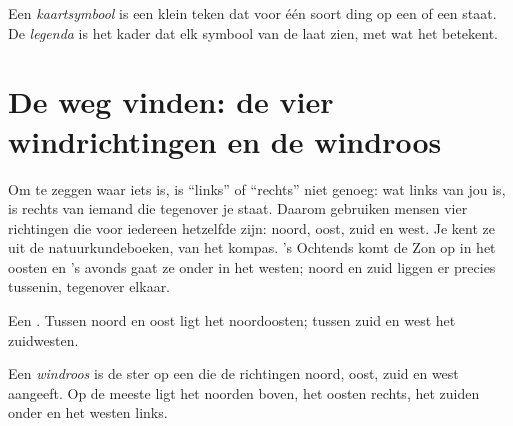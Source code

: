 \begin{definition}[Legenda]\label{def:g2:drawing-to-map:legend}
Een \emph{kaartsymbool} is een klein teken dat voor één
soort ding op een  of een  staat. De
\emph{legenda} is het kader dat elk symbool van de 
laat zien, met wat het betekent.
\end{definition}

\section{De weg vinden: de vier windrichtingen en de windroos}

Om te zeggen waar iets is, is ``links'' of ``rechts'' niet genoeg: wat
links van jou is, is rechts van iemand die tegenover je staat. Daarom
gebruiken mensen vier richtingen die voor iedereen hetzelfde zijn: noord,
oost, zuid en west. Je kent ze uit de natuurkundeboeken, van het kompas.
's Ochtends komt de Zon op in het oosten en 's avonds gaat ze onder in het
westen; noord en zuid liggen er precies tussenin, tegenover elkaar.

\begin{omfigure}

{\small Een . Tussen noord en oost ligt het noordoosten; tussen
zuid en west het zuidwesten.}
\label{fig:g2:drawing-to-map:rose}
\end{omfigure}

\begin{definition}[Windroos]\label{def:g2:drawing-to-map:directions}
Een \emph{windroos} is de ster op een  die de
richtingen noord, oost, zuid en west aangeeft. Op de meeste  ligt
het noorden boven, het oosten rechts, het zuiden onder en het westen links.
\end{definition}

